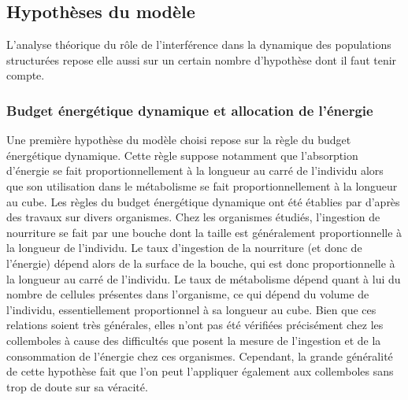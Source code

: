 \subsection{Hypothèses du modèle}

L'analyse théorique du rôle de l'interférence dans la dynamique des populations
structurées repose elle aussi sur un certain nombre d'hypothèse dont il faut
tenir compte.

\subsubsection{Budget énergétique dynamique et allocation de l'énergie}

Une première hypothèse du modèle choisi repose sur la règle du budget
énergétique dynamique. Cette règle suppose notamment que l'absorption d'énergie
se fait proportionnellement à la longueur au carré de l'individu alors que son 
utilisation dans le métabolisme se fait proportionnellement à la longueur au
cube.
Les règles du budget énergétique dynamique ont été établies par \textcites{kooijman2000a}
d'après des travaux sur divers organismes. Chez les organismes étudiés,
l'ingestion de nourriture se fait par une bouche dont la taille est généralement
proportionnelle à la longueur de l'individu. Le taux d'ingestion de la
nourriture (et donc de l'énergie) dépend alors de la surface de la bouche, qui
est donc proportionnelle à la longueur au carré de l'individu. Le taux de
métabolisme dépend quant à lui du nombre de cellules présentes dans
l'organisme, ce qui dépend du volume de l'individu, essentiellement
proportionnel à sa longueur au cube. Bien que ces relations soient très
générales, elles n'ont pas été vérifiées précisément chez les collemboles à
cause des difficultés que posent la mesure de l'ingestion et de la consommation
de l'énergie chez ces organismes. Cependant, la grande généralité de cette
hypothèse fait que l'on peut l'appliquer également aux collemboles sans trop
de doute sur sa véracité.

